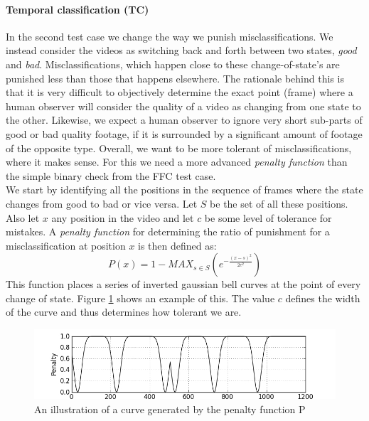 \paragraph{Temporal classification (TC)} \label{sec:tctestcase}
%
In the second test case we change the way we punish misclassifications. We instead consider the videos as switching back and forth between two states, \textit{good} and \textit{bad}. Misclassifications, which happen close to these change-of-state's are punished less than those that happens elsewhere. The rationale behind this is that it is very difficult to objectively determine the exact point (frame) where a human observer will consider the quality of a video as changing from one state to the other. Likewise, we expect a human observer to ignore very short sub-parts of good or bad quality footage, if it is surrounded by a significant amount of footage of the opposite type. Overall, we want to be more tolerant of misclassifications, where it makes sense. For this we need a more advanced \textit{penalty function} than the simple binary check from the FFC test case.\\
%
We start by identifying all the positions in the sequence of frames where the state changes from good to bad or vice versa. Let $S$ be the set of all these positions. Also let $x$ any position in the video and let $c$ be some level of tolerance for mistakes. A \emph{penalty function} for determining the ratio of punishment for a misclassification at position $x$ is then defined as:
%
\begin{displaymath}
P(x) =1 - MAX_{s\in S}(e^{-\frac{(x-s)^{2}}{2c^{2}}})
\end{displaymath}
%
This function places a series of inverted gaussian bell curves at the point of every change of state. Figure \ref{fig:penaltycurve} shows an example of this. The value $c$ defines the width of the curve and thus determines how tolerant we are.
%
%
\begin{figure}
\includegraphics[width=1\textwidth]{img/penaltyfunction.jpg}
\caption{An illustration of a curve generated by the penalty function P}
\label{fig:penaltycurve}
\end{figure}
%
